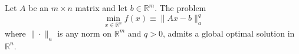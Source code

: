 \documentclass{ExerciseSheet}
\newif\ifsolutions
\begin{document}


\begin{problem}

Let $A$ be an $m \times n$ matrix and let $b \in \mathbb{R}^m$. The problem
\[
\min_{x \in \mathbb{R}^n} f(x) \equiv \|Ax - b\|_a^q
\]
where $\|\cdot\|_a$ is any norm on $\mathbb{R}^m$ and $q > 0$, admits a global optimal solution in $\mathbb{R}^n$.
\end{problem}

\ifsolutions
\vskip 0.3cm
\end{document}
